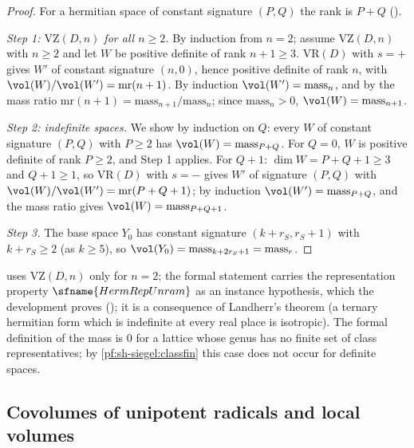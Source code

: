 \begin{proof}
For a hermitian space of constant signature $(P,Q)$ the rank is $P+Q$ ().

\emph{Step 1: $\mathrm{VZ}(D,n)$ for all $n\ge2$.} By induction from $n=2$; assume $\mathrm{VZ}(D,n)$ with $n\ge2$ and let $W$ be
positive definite of rank $n+1\ge3$. $\mathrm{VR}(D)$ with $s=+$ gives $W'$ of constant signature $(n,0)$, hence positive
definite of rank $n$, with $\vol(W)/\vol(W')=\mathrm{mr}(n+1)$. By induction $\vol(W')=\mathrm{mass}_n$, and by the mass ratio
$\mathrm{mr}(n+1)=\mathrm{mass}_{n+1}/\mathrm{mass}_n$; since $\mathrm{mass}_n>0$, $\vol(W)=\mathrm{mass}_{n+1}$.

\emph{Step 2: indefinite spaces.} We show by induction on $Q$: every $W$ of constant signature $(P,Q)$ with $P\ge2$ has
$\vol(W)=\mathrm{mass}_{P+Q}$. For $Q=0$, $W$ is positive definite of rank $P\ge2$, and Step 1 applies. For $Q+1$: $\dim
W=P+Q+1\ge3$ and $Q+1\ge1$, so $\mathrm{VR}(D)$ with $s=-$ gives $W'$ of signature $(P,Q)$ with
$\vol(W)/\vol(W')=\mathrm{mr}(P+Q+1)$; by induction $\vol(W')=\mathrm{mass}_{P+Q}$, and the mass ratio gives
$\vol(W)=\mathrm{mass}_{P+Q+1}$.

\emph{Step 3.} The base space $Y_0$ has constant signature $(k+r_S,r_S+1)$ with $k+r_S\ge2$ (as $k\ge5$), so
$\vol(Y_0)=\mathrm{mass}_{k+2r_S+1}=\mathrm{mass}_r$.
\end{proof}

\begin{remark}
 uses $\mathrm{VZ}(D,n)$ only for $n=2$; the formal statement carries the representation property
$\sfname{HermRepUnram}$ as an instance hypothesis, which the development proves
(); it is a consequence of Landherr's theorem \cite{Landherr1936} (a ternary hermitian form
which is indefinite at every real place is isotropic). The formal definition of the mass is $0$ for a lattice whose genus has no
finite set of class representatives; by \cref{pf:sh-siegel:classfin} this case does not occur for definite spaces.
\end{remark}


\subsection{Covolumes of unipotent radicals and local volumes}\label{sec:pf:sh-siegel:covol}

